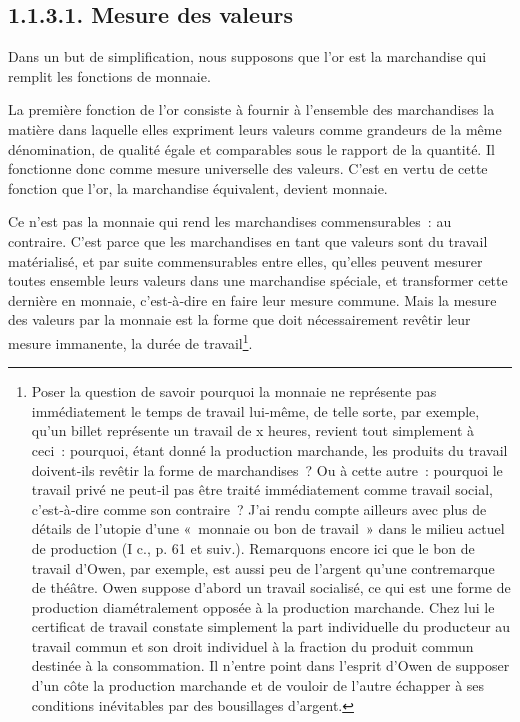 \documentclass[french,twoside]{book} %
\begin{document}
\subsection[{1.1.3.1. Mesure des valeurs}]{1.1.3.1. Mesure des valeurs}
\noindent Dans un but de simplification, nous supposons que l’or est la marchandise qui remplit les fonctions de monnaie.\par
La première fonction de l’or consiste à fournir à l’ensemble des marchandises la matière dans laquelle elles expriment leurs valeurs comme grandeurs de la même dénomination, de qualité égale et comparables sous le rapport de la quantité. Il fonctionne donc comme mesure universelle des valeurs. C’est en vertu de cette fonction que l’or, la marchandise équivalent, devient monnaie.\par
Ce n’est pas la monnaie qui rend les marchandises commensurables : au contraire. C’est parce que les marchandises en tant que valeurs sont du travail matérialisé, et par suite commensurables entre elles, qu’elles peuvent mesurer toutes ensemble leurs valeurs dans une marchandise spéciale, et transformer cette dernière en monnaie, c’est‑à‑dire en faire leur mesure commune. Mais la mesure des valeurs par la monnaie est la forme que doit nécessairement revêtir leur mesure immanente, la durée de travail\footnote{Poser la question de savoir pourquoi la monnaie ne représente pas immédiatement le temps de travail lui‑même, de telle sorte, par exemple, qu’un billet représente un travail de x heures, revient tout simplement à ceci : pourquoi, étant donné la production marchande, les produits du travail doivent‑ils revêtir la forme de marchandises ? Ou à cette autre : pourquoi le travail privé ne peut‑il pas être traité immédiatement comme travail social, c’est‑à‑dire comme son contraire ? J’ai rendu compte ailleurs avec plus de détails de l’utopie d’une « monnaie ou bon de travail » dans le milieu actuel de production (I c., p. 61 et suiv.). Remarquons encore ici que le bon de travail d’Owen, par exemple, est aussi peu de l’argent qu’une contremarque de théâtre. Owen suppose d’abord un travail socialisé, ce qui est une forme de production diamétralement opposée à la production marchande. Chez lui le certificat de travail constate simplement la part individuelle du producteur au travail commun et son droit individuel à la fraction du produit commun destinée à la consommation. Il n’entre point dans l’esprit d’Owen de supposer d’un côte la production marchande et de vouloir de l’autre échapper à ses conditions inévitables par des bousillages d’argent.}.\par
\end{document}
